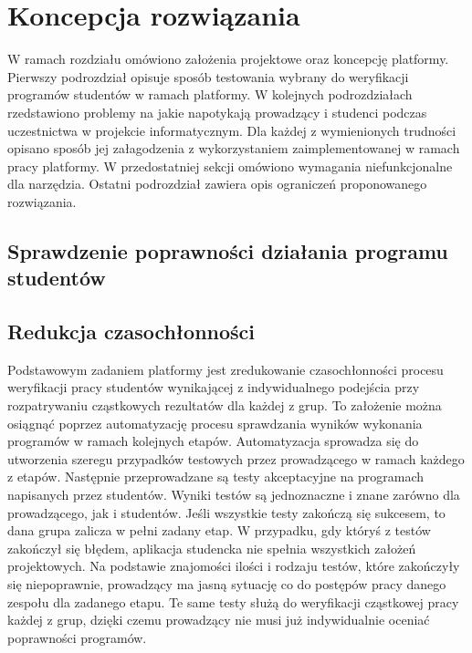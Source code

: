 \chapter{Koncepcja rozwiązania}
\label{chapter:requirements}

W ramach rozdziału omówiono założenia projektowe oraz koncepcję platformy.
Pierwszy podrozdział opisuje sposób testowania wybrany do weryfikacji programów studentów w ramach platformy.
W kolejnych podrozdziałach rzedstawiono problemy na jakie napotykają prowadzący i studenci podczas uczestnictwa w projekcie informatycznym.
Dla każdej z wymienionych trudności opisano sposób jej załagodzenia z wykorzystaniem zaimplementowanej w ramach pracy platformy.
W przedostatniej sekcji omówiono wymagania niefunkcjonalne dla narzędzia.
Ostatni podrozdział zawiera opis ograniczeń proponowanego rozwiązania.

\section{Sprawdzenie poprawności działania programu studentów}


\section{Redukcja czasochłonności}

Podstawowym zadaniem platformy jest zredukowanie czasochłonności procesu weryfikacji pracy studentów wynikającej z indywidualnego podejścia przy rozpatrywaniu cząstkowych rezultatów dla każdej z grup.
To założenie można osiągnąć poprzez automatyzację procesu sprawdzania wyników wykonania programów w ramach kolejnych etapów.
Automatyzacja sprowadza się do utworzenia szeregu przypadków testowych przez prowadzącego w ramach każdego z etapów.
Następnie przeprowadzane są testy akceptacyjne na programach napisanych przez studentów.
Wyniki testów są jednoznaczne i znane zarówno dla prowadzącego, jak i studentów.
Jeśli wszystkie testy zakończą się sukcesem, to dana grupa zalicza w pełni zadany etap.
W przypadku, gdy któryś z testów zakończył się błędem, aplikacja studencka nie spełnia wszystkich założeń projektowych.
Na podstawie znajomości ilości i rodzaju testów, które zakończyły się niepoprawnie, prowadzący ma jasną sytuację co do postępów pracy danego zespołu dla zadanego etapu.
Te same testy służą do weryfikacji cząstkowej pracy każdej z grup, dzięki czemu prowadzący nie musi już indywidualnie oceniać poprawności programów.

